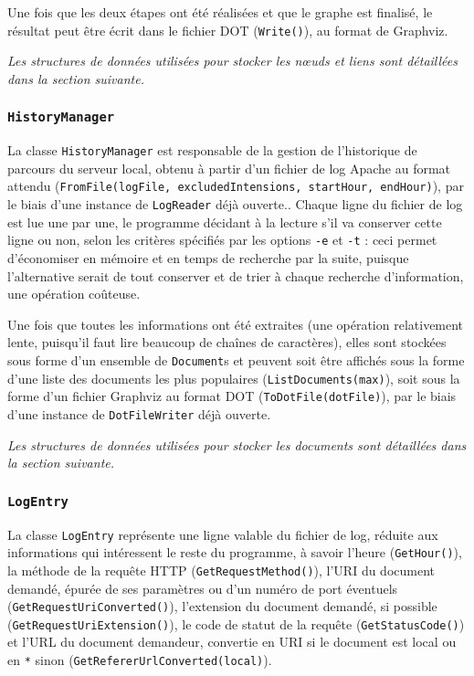 \documentclass[11pt,a4paper]{article}
\begin{document}
	Une fois que les deux étapes ont été réalisées et que le graphe est finalisé, le résultat peut être écrit dans le fichier DOT (\texttt{Write()}), au format de Graphviz.
	
	\textit{Les structures de données utilisées pour stocker les nœuds et liens sont détaillées dans la section suivante.}
	
	\subsubsection{\texttt{HistoryManager}}
	
	La classe \texttt{HistoryManager} est responsable de la gestion de l'historique de parcours du serveur local, obtenu à partir d'un fichier de log Apache au format attendu (\texttt{FromFile(logFile, excludedIntensions, startHour, endHour)}), par le biais d'une instance de \texttt{LogReader} déjà ouverte.. Chaque ligne du fichier de log est lue une par une, le programme décidant à la lecture s'il va conserver cette ligne ou non, selon les critères spécifiés par les options \texttt{-e} et \texttt{-t} : ceci permet d'économiser en mémoire et en temps de recherche par la suite, puisque l'alternative serait de tout conserver et de trier à chaque recherche d'information, une opération coûteuse.
	
	Une fois que toutes les informations ont été extraites (une opération relativement lente, puisqu'il faut lire beaucoup de chaînes de caractères), elles sont stockées sous forme d'un ensemble de \texttt{Document}s et peuvent soit être affichés sous la forme d'une liste des documents les plus populaires (\texttt{ListDocuments(max)}), soit sous la forme d'un fichier Graphviz au format DOT (\texttt{ToDotFile(dotFile)}), par le biais d'une instance de \texttt{DotFileWriter} déjà ouverte.
	
	\textit{Les structures de données utilisées pour stocker les documents sont détaillées dans la section suivante.}
	
	\subsubsection{\texttt{LogEntry}}
	
	La classe \texttt{LogEntry} représente une ligne valable du fichier de log, réduite aux informations qui intéressent le reste du programme, à savoir l'heure (\texttt{GetHour()}), la méthode de la requête HTTP (\texttt{GetRequestMethod()}), l'URI du document demandé, épurée de ses paramètres ou d'un numéro de port éventuels (\texttt{GetRequestUriConverted()}), l'extension du document demandé, si possible (\texttt{GetRequestUriExtension()}), le code de statut de la requête (\texttt{GetStatusCode()}) et l'URL du document demandeur, convertie en URI si le document est local ou en \texttt{*} sinon (\texttt{GetRefererUrlConverted(local)}).
	
\end{document}
